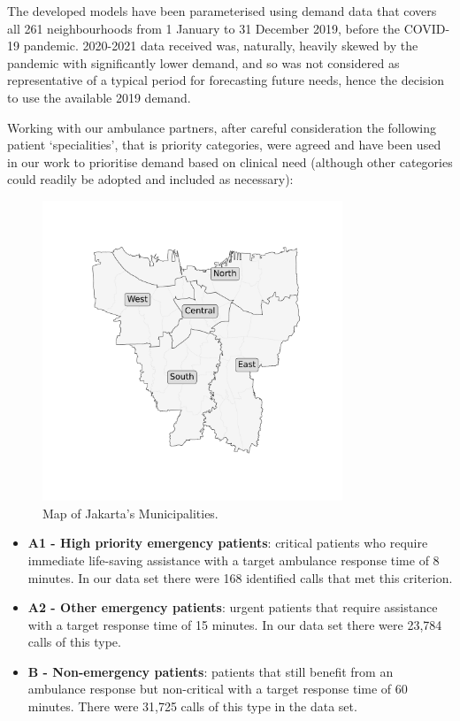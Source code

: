 \documentclass[preprint,12pt]{elsarticle}
\begin{document}
The developed models have been parameterised using demand data that covers all 261 neighbourhoods from 1 January to 31 December 2019, before the COVID-19 pandemic. 2020-2021 data received was, naturally, heavily skewed by the pandemic with significantly  lower demand, and so was not considered as representative of a typical period for forecasting future needs, hence the decision to use the available 2019 demand.  

Working with our ambulance partners, after careful consideration the following patient `specialities', that is priority categories, were agreed and have been used in our work to prioritise demand based on clinical need (although other categories could readily be adopted and included as necessary):

\begin{figure}
\begin{center}
\includegraphics[width=0.8\textwidth]{img/jakarta_region_names.pdf}
\end{center}
\caption{Map of Jakarta's Municipalities.}
\label{fig:region_names}
\end{figure}

\begin{itemize}
  \item \textbf{A1 - High priority emergency patients}: critical patients who require immediate life-saving assistance with a target ambulance response time of 8 minutes.  In our data set there were 168 identified calls that met this criterion.
  \item \textbf{A2 - Other emergency patients}: urgent patients that require assistance with a target response time of 15 minutes. In our data set there were 23,784 calls of this type.
  \item \textbf{B - Non-emergency patients}: patients that still benefit from an ambulance response but non-critical with a target response time of 60 minutes. There were 31,725 calls of this type in the data set.
\end{itemize}
\end{document}
